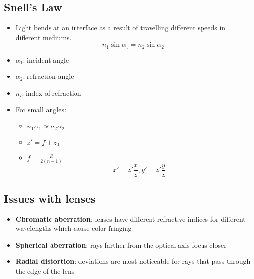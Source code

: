 \subsection{Snell's Law}
\begin{itemize}
	\item Light bends at an interface as a result of travelling different speeds in different mediums.
	$$n_1 \sin\alpha_1=n_2\sin \alpha_2$$
	\item $\alpha_1$: incident angle
	\item $\alpha_2$: refraction angle
	\item $n_i$: index of refraction
	\item For small angles:
	\begin{itemize}
		\item $n_1\alpha_1\approx n_2\alpha_2$
		\item $z' = f+z_0$
		\item $f = \frac{R}{2(n-1)}$
		$$x' = z'\frac{x}{z}, y'=z'\frac{y}{z}$$
	\end{itemize}
\end{itemize}

\subsection{Issues with lenses}
\begin{itemize}
	\item \textbf{Chromatic aberration}: lenses have different refractive indices for different wavelengths which cause color fringing
	\item \textbf{Spherical aberration}: rays farther from the optical axis focus closer 
	\item \textbf{Radial distortion}: deviations are most noticeable for rays that pass through the edge of the lens
\end{itemize}

